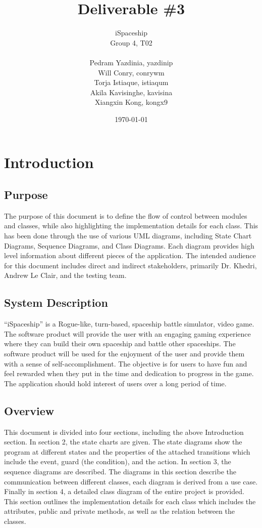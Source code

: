 \documentclass[]{article}
\title{Deliverable \#3}
\author{   iSpaceship
        \\ Group 4, T02
        \\
		\\ Pedram Yazdinia, yazdinip
		\\ Will Conry, conrywm
		\\ Torja Istiaque, istiaqum
		\\ Akila Kavisinghe, kavisina
		\\ Xiangxin Kong, kongx9
}
\date{\today}
\begin{document}
\maketitle	

\section{Introduction}
\label{sec:introduction}


\subsection{Purpose}
\label{sub:purpose}
The purpose of this document is to define the flow of control between modules and classes, while also highlighting the implementation details for each class. This has been done through the use of various UML diagrams, including State Chart Diagrams, Sequence Diagrams, and Class Diagrams. Each diagram provides high level information about different pieces of the application. The intended audience for this document includes direct and indirect stakeholders, primarily Dr. Khedri, Andrew Le Clair, and the testing team. 

\subsection{System Description}
\label{sub:system_description}
 “iSpaceship” is a Rogue-like, turn-based, spaceship battle simulator, video game. The software product will provide the user with an engaging gaming experience where they can build their own spaceship and battle other spaceships. The software product will be used for the enjoyment of the user and provide them with a sense of self-accomplishment. The objective is for users to have fun and feel rewarded when they put in the time and dedication to progress in the game. The application should hold interest of users over a long period of time.


\subsection{Overview}
\label{sub:overview}
This document is divided into four sections, including the above Introduction section. In section 2, the state charts are given. The state diagrams show the program at different states and the properties of the attached transitions which include the event, guard (the condition), and the action. In section 3, the sequence diagrams are described. The diagrams in this section describe the communication between different classes, each diagram is derived from a use case. Finally in section 4, a detailed class diagram of the entire project is provided. This section outlines the implementation details for each class which includes the attributes, public and private methods, as well as the relation between the classes.
\end{document}
